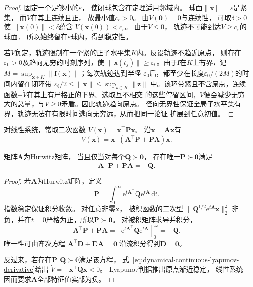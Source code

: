 \begin{proof}
	固定一个足够小的$\varepsilon$， 使闭球包含在定理适用邻域内。 球面$\lVert\bm{x}\rVert
	=\varepsilon$是紧集， 而$V$在其上连续且正， 故最小值$c_{\varepsilon}>0$。 由$V(
	\bm{0})=0$与连续性， 可取$\delta>0$使 $\lVert\bm{x}(0)\rVert<\delta$蕴含
	$V(\bm{x}(0))<c_{\varepsilon}$。 由于$\dot V\leq0$， 轨迹不可能到达$V\geq c_{\varepsilon}$的球面，
	所以始终留在$\varepsilon$球内，得到稳定性。

	若$\dot V$负定，轨迹限制在一个紧的正子水平集$K$内。反设轨迹不趋近原点，
	则存在$\varepsilon_0>0$及趋向无穷的时刻序列，使
	$\lVert\bm{x}(t_j)\rVert\geq\varepsilon_0$。由于$\bm f$在$K$上有界，记
	$M=\sup_{\bm{x}\in K}\lVert\bm f(\bm{x})\rVert$；每次轨迹达到半径
	$\varepsilon_0$后，都至少在长度$\varepsilon_0/(2M)$的时间内留在闭环带
	$\varepsilon_0/2\leq\lVert\bm{x}\rVert\leq\sup_{\bm{z}\in K}\lVert\bm{z}\rVert$
	中。该环带紧且不含原点，连续函数$-\dot V$在其上有严格正的下界。选取互不相交
	的这些停留区间，$V$便会减少无穷大的总量，与$V\geq0$矛盾。因此轨迹趋向原点。
	径向无界性保证全局子水平集有界，轨迹无法在有限时间逃向无穷远，从而把同一论证
	扩展到任意初值。
\end{proof}

对线性系统，常取二次函数 $V(\bm{x})=\bm{x}^{\top}\bm{P}\bm{x}$。 沿$\dot{\bm{x}}=
\bm{A}\bm{x}$有
\begin{equation}
	\dot V(\bm{x}) = \bm{x}^{\top}(\bm{A}^{\top}\bm{P}+\bm{P}\bm{A}) \bm{x}. \label{eq:dynamical-continuous-lyapunov-derivative}
\end{equation}

\begin{theorem}[线性Lyapunov方程]
	\label{thm:dynamical-linear-lyapunov-equation} 矩阵$\bm{A}$为Hurwitz矩阵， 当且仅当对每个$\bm
	{Q}\succ\bm{0}$， 存在唯一$\bm{P}\succ\bm{0}$满足
	\begin{equation}
		\bm{A}^{\top}\bm{P}+\bm{P}\bm{A}= -\bm{Q}. \label{eq:dynamical-continuous-lyapunov-equation}
	\end{equation}
\end{theorem}

\begin{proof}
	若$\bm{A}$为Hurwitz矩阵，定义
	\[
		\bm{P}= \int_{0}^{\infty}\mathrm{e}^{t\bm{A}^{\top}}\bm{Q}\mathrm{e}^{t\bm{A}}
		\,\mathrm{d}t.
	\]
	指数稳定保证积分收敛。 对任意非零$\bm{x}$， 被积函数的二次型 $\lVert\bm{Q}^{1/2}
	\mathrm{e}^{t\bm{A}}\bm{x}\rVert_{2}^{2}$ 非负，并在$t=0$严格为正，所以$\bm{P}\succ
	\bm{0}$。 对被积矩阵求导并积分，
	\[
		\bm{A}^{\top}\bm{P}+\bm{P}\bm{A}= \left[ \mathrm{e}^{t\bm{A}^{\top}}\bm{Q}\mathrm{e}
		^{t\bm{A}}\right]_{0}^{\infty}= -\bm{Q}.
	\]
	唯一性可由齐次方程 $\bm{A}^{\top}\bm{D}+\bm{D}\bm{A}=\bm{0}$ 沿流积分得到$\bm{D}
	=\bm{0}$。

	反过来，若存在$\bm{P},\bm{Q}\succ\bm{0}$满足该方程， 式~\eqref{eq:dynamical-continuous-lyapunov-derivative}给出
	$\dot V=-\bm{x}^{\top}\bm{Q}\bm{x}<0$。 Lyapunov判据推出原点渐近稳定， 线性系统因而要求$\bm
	{A}$全部特征值实部为负。
\end{proof}

